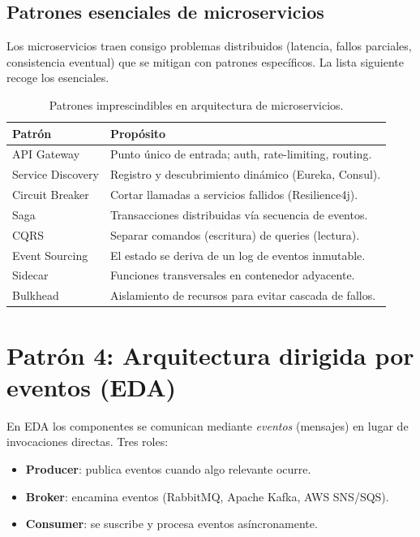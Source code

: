 \subsection{Patrones esenciales de microservicios}

Los microservicios traen consigo problemas distribuidos
(latencia, fallos parciales, consistencia eventual) que se mitigan
con patrones específicos. La lista siguiente recoge los esenciales.


\begin{table}[htbp]
\centering
\caption{Patrones imprescindibles en arquitectura de microservicios.}
\footnotesize
\begin{tabularx}{\textwidth}{lX}
\toprule
\textbf{Patrón} & \textbf{Propósito}\\
\midrule
API Gateway & Punto único de entrada; auth, rate-limiting, routing.\\
Service Discovery & Registro y descubrimiento dinámico (Eureka, Consul).\\
Circuit Breaker & Cortar llamadas a servicios fallidos (Resilience4j).\\
Saga & Transacciones distribuidas vía secuencia de eventos.\\
CQRS & Separar comandos (escritura) de queries (lectura).\\
Event Sourcing & El estado se deriva de un log de eventos inmutable.\\
Sidecar & Funciones transversales en contenedor adyacente.\\
Bulkhead & Aislamiento de recursos para evitar cascada de fallos.\\
\bottomrule
\end{tabularx}
\end{table}

\section{Patrón 4: Arquitectura dirigida por eventos (EDA)}

En EDA los componentes se comunican mediante \emph{eventos}
(mensajes) en lugar de invocaciones directas. Tres roles:

\begin{itemize}
\item \textbf{Producer}: publica eventos cuando algo relevante ocurre.
\item \textbf{Broker}: encamina eventos (RabbitMQ, Apache Kafka, AWS
SNS/SQS).
\item \textbf{Consumer}: se suscribe y procesa eventos
asíncronamente.
\end{itemize}

